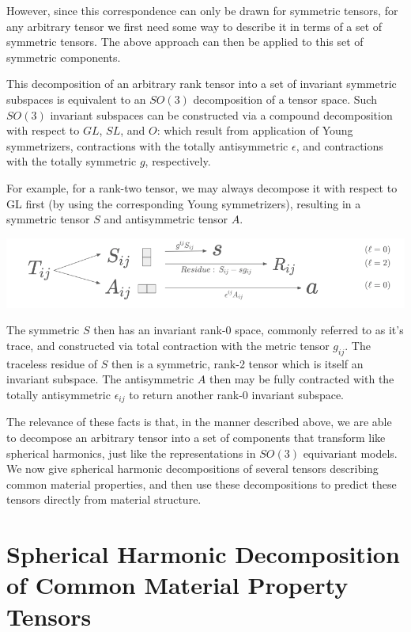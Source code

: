 \documentclass[10pt,a4paper]{article}
\begin{document}
However, since this correspondence can only be drawn for symmetric tensors, for any arbitrary tensor we first need some way to describe it in terms of a set of symmetric tensors. The above approach can then be applied to this set of symmetric components.

This decomposition of an arbitrary rank tensor into a set of invariant symmetric subspaces is equivalent to an $SO(3)$ decomposition of a tensor space. Such $SO(3)$ invariant subspaces can be constructed via a compound decomposition with respect to $GL$, $SL$, and $O$: which result from application of Young symmetrizers, contractions with the totally antisymmetric $\epsilon$, and contractions with the totally symmetric $g$, respectively.

For example, for a rank-two tensor, we may always decompose it with respect to GL first (by using the corresponding Young symmetrizers), resulting in a symmetric tensor $S$ and antisymmetric tensor $A$.
\begin{center}

\medskip

\includegraphics[scale=1.1]{rank2.png}
\end{center}
The symmetric $S$ then has an invariant rank-0 space, commonly referred to as it's trace, and constructed via total contraction with the metric tensor $g_{ij}$. The traceless residue of $S$ then is a symmetric, rank-2 tensor which is itself an invariant subspace. The antisymmetric $A$ then may be fully contracted with the totally antisymmetric $\epsilon_{ij}$ to return another rank-0 invariant subspace.

The relevance of these facts is that, in the manner described above, we are able to decompose an arbitrary tensor into a set of components that transform like spherical harmonics, just like the representations in $SO(3)$ equivariant models. We now give spherical harmonic decompositions of several tensors describing common material properties, and then use these decompositions to predict these tensors directly from material structure.


\section{Spherical Harmonic Decomposition of Common Material Property Tensors}
\end{document}
